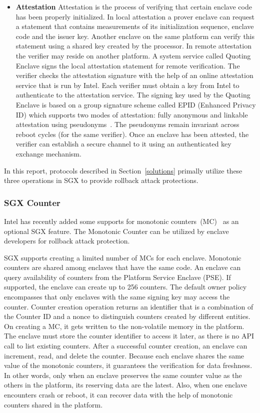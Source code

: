 \begin{itemize}
	\item \textbf{Attestation} Attestation is the process of verifying that certain enclave code has been properly initialized. In local attestation a prover enclave can request a statement that contains measurements of its initialization sequence, enclave code and the issuer key. Another enclave on the same platform can verify this statement using a shared key created by the processor. In remote attestation the verifier may reside on another platform. A system service called Quoting Enclave signs the local attestation statement for remote verification. The verifier checks the attestation signature with the help of an online attestation service that is run by Intel. Each verifier must obtain a key from Intel to authenticate to the attestation service. The signing key used by the Quoting Enclave is based on a group signature scheme called EPID (Enhanced Privacy ID) which supports two modes of attestation: fully anonymous and linkable attestation using pseudonyms~\cite{sgxexplained}. The pseudonyms remain invariant across reboot cycles (for the same verifier). Once an enclave has been attested, the verifier can establish a secure channel to it using an authenticated key exchange mechanism.

\end{itemize}

In this report, protocols described in Section~\ref{solutions} primally utilize these three operations in SGX to provide rollback attack protections.

\subsubsection{SGX Counter}

Intel has recently added some supports for monotonic counters~(MC)~\cite{karande2017sgx, enclavedb:sp18, alder2018migrating} as an optional SGX feature. The Monotonic Counter can be utilized by enclave developers for rollback attack protection. 

SGX supports creating a limited number of MCs for each enclave. Monotonic counters are shared among enclaves that have the same code. An enclave can query availability of counters from the Platform Service Enclave (PSE). If supported, the enclave can create up to 256 counters. The default owner policy encompasses that only enclaves with the same signing key may access the counter. Counter creation operation returns an identifier that is a combination of the Counter ID and a nonce to distinguish counters created by different entities. On creating a MC, it gets written to the non-volatile memory in the platform. The enclave must store the counter identifier to access it later, as there is no API call to list existing counters. After a successful counter creation, an enclave can increment, read, and delete the counter. Because each enclave shares the same value of the monotonic counters, it guarantees the verification for data freshness. In other words, only when an enclave preserves the same counter value as the others in the platform, its reserving data are the latest. Also, when one enclave encounters crash or reboot, it can recover data with the help of monotonic counters shared in the platform. 

